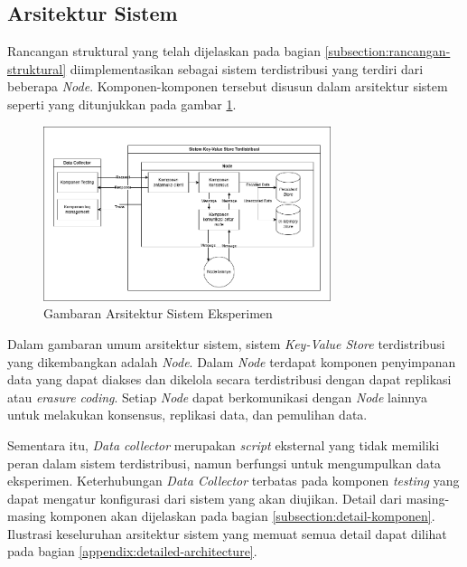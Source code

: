 \subsection{Arsitektur Sistem}
\label{subsection:system-architecture}

Rancangan struktural yang telah dijelaskan pada bagian \ref{subsection:rancangan-struktural} diimplementasikan sebagai sistem terdistribusi yang terdiri dari beberapa \textit{Node}. Komponen-komponen tersebut disusun dalam arsitektur sistem seperti yang ditunjukkan pada gambar \ref{fig:general-architecture}.

\begin{figure}[ht]
    \centering
    \includegraphics[width=0.75\textwidth]{resources/chapter-3/general-architecture.png}
    \caption{Gambaran Arsitektur Sistem Eksperimen}
    \label{fig:general-architecture}
\end{figure}

Dalam gambaran umum arsitektur sistem, sistem \textit{Key-Value Store} terdistribusi yang dikembangkan adalah \textit{Node}. Dalam \textit{Node} terdapat komponen penyimpanan data yang dapat diakses dan dikelola secara terdistribusi dengan dapat replikasi atau \textit{erasure coding}. Setiap \textit{Node} dapat berkomunikasi dengan \textit{Node} lainnya untuk melakukan konsensus, replikasi data, dan pemulihan data.

Sementara itu, \textit{Data collector} merupakan \textit{script} eksternal yang tidak memiliki peran dalam sistem terdistribusi, namun berfungsi untuk mengumpulkan data eksperimen. Keterhubungan \textit{Data Collector} terbatas pada komponen \textit{testing} yang dapat mengatur konfigurasi dari sistem yang akan diujikan. Detail dari masing-masing komponen akan dijelaskan pada bagian \ref{subsection:detail-komponen}. Ilustrasi keseluruhan arsitektur sistem yang memuat semua detail dapat dilihat pada bagian \ref{appendix:detailed-architecture}.

